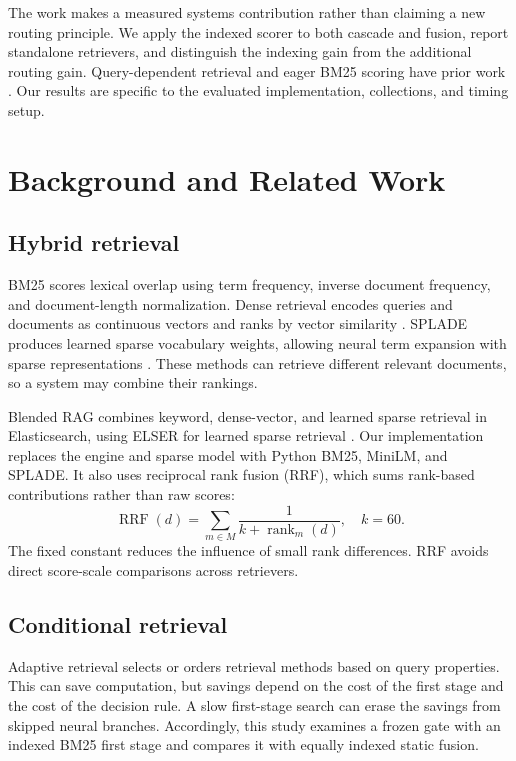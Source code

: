 \documentclass[conference]{IEEEtran}
\begin{document}
The work makes a measured systems contribution rather than claiming a new routing principle. We apply the indexed scorer to both cascade and fusion, report standalone retrievers, and distinguish the indexing gain from the additional routing gain. Query-dependent retrieval and eager BM25 scoring have prior work \cite{adaptive,bm25s}. Our results are specific to the evaluated implementation, collections, and timing setup.

\section{Background and Related Work}
\subsection{Hybrid retrieval}
BM25 scores lexical overlap using term frequency, inverse document frequency, and document-length normalization. Dense retrieval encodes queries and documents as continuous vectors and ranks by vector similarity \cite{sbert}. SPLADE produces learned sparse vocabulary weights, allowing neural term expansion with sparse representations \cite{splade}. These methods can retrieve different relevant documents, so a system may combine their rankings.

Blended RAG combines keyword, dense-vector, and learned sparse retrieval in Elasticsearch, using ELSER for learned sparse retrieval \cite{blended}. Our implementation replaces the engine and sparse model with Python BM25, MiniLM, and SPLADE. It also uses reciprocal rank fusion (RRF), which sums rank-based contributions rather than raw scores:
\begin{equation}
  \operatorname{RRF}(d)=\sum_{m\in M}\frac{1}{k+\operatorname{rank}_{m}(d)},\quad k=60.
\end{equation}
The fixed constant reduces the influence of small rank differences. RRF avoids direct score-scale comparisons across retrievers.

\subsection{Conditional retrieval}
Adaptive retrieval selects or orders retrieval methods based on query properties. This can save computation, but savings depend on the cost of the first stage and the cost of the decision rule. A slow first-stage search can erase the savings from skipped neural branches. Accordingly, this study examines a frozen gate with an indexed BM25 first stage and compares it with equally indexed static fusion.
\end{document}
